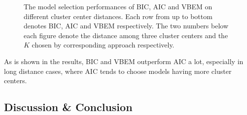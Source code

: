 \documentclass[12pt,a4paper]{article}
\theoremstyle{definition}
\begin{document}
\begin{figure}[H]
{	}
	\caption{The model selection performances of BIC, AIC and VBEM on different cluster center distances. Each row from up to bottom denotes BIC, AIC and VBEM respectively. The two numbers below each figure denote the distance among three cluster centers and the $K$ chosen by corresponding approach respectively.}
	\label{fig:dis}
\end{figure}

As is shown in the results, BIC and VBEM outperform AIC a lot, especially in long distance cases, where AIC tends to choose models having more cluster centers.

\subsection{Discussion \& Conclusion}
\end{document}
